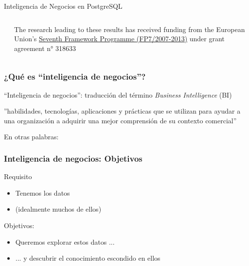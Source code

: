 \frame
{

\begin{center}
 \Huge{Inteligencia de Negocios en PostgreSQL}
\end{center}

\vfill

\begin{columns}

\begin{column}{0.3\textwidth}
\end{column}
\begin{column}{0.7\textwidth}
\raggedleft \footnotesize
The research leading to these results has received funding from the European Union's \href{http://ec.europa.eu/research/fp7/index_en.cfm}{\underline{Seventh Framework Programme (FP7/2007-2013)}} under grant agreement n° 318633
\end{column}
\end{columns}
}

\frame
{ \frametitle{¿Qué es “inteligencia de negocios”?}

{\Large “Inteligencia de negocios”}: traducción del término
\emph{Business Intelligence} (BI)

\vfill

{\raggedleft
”habilidades, tecnologías, aplicaciones y prácticas
que se utilizan para ayudar a una organización a
adquirir una mejor comprensión de su contexto comercial”}

\vfill

\pause
{\small En otras palabras:}
\vfill
{}

}

\frame
{ \frametitle{Inteligencia de negocios: Objetivos}

	\large{Requisito}
	\begin{itemize}
		\item Tenemos los datos
		\item (idealmente muchos de ellos)
	\end{itemize}

	\vfill \pause

	\large{Objetivos:}
	\begin{itemize}
		\item Queremos explorar estos datos ...
		\item ... y descubrir el conocimiento escondido en ellos
	\end{itemize}
}
% 
% 
% 
% 

